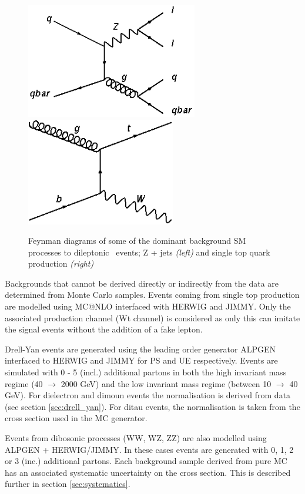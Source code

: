 \begin{figure}[htbp!]
\begin{center}
\includegraphics[width=75mm]{f/Z_jets}
\includegraphics[width=65mm]{f/single_top_Wt}
\end{center}
\caption{Feynman diagrams of some of the dominant background SM processes to dileptonic \ttbar\ events; Z + jets \emph{(left)} and single top quark production \emph{(right)}}
\label{fig:background_feynman}
\end{figure}

Backgrounds that cannot be derived directly or indirectly from the data are determined from Monte Carlo samples. Events coming from single top production are modelled using MC@NLO interfaced with HERWIG and JIMMY. Only the associated production channel (Wt channel) is considered as only this can imitate the signal events without the addition of a fake lepton. 

Drell-Yan events are generated using the leading order generator ALPGEN interfaced to HERWIG and JIMMY for PS and UE respectively. Events are simulated with 0 - 5 (incl.) additional partons in both the high invariant mass regime (40 $\rightarrow$ 2000 GeV) and the low invariant mass regime (between 10 $\rightarrow$ 40 GeV). For dielectron and dimoun events the normalisation is derived from data (see section \ref{sec:drell_yan}). For ditau events, the normalisation is taken from the cross section used in the MC generator.

Events from dibosonic processes (WW, WZ, ZZ) are also modelled using ALPGEN + HERWIG/JIMMY. In these cases events are generated with 0, 1, 2 or 3 (inc.) additional partons. Each background sample derived from pure MC has an associated systematic uncertainty on the cross section. This is described further in section \ref{sec:systematics}.

